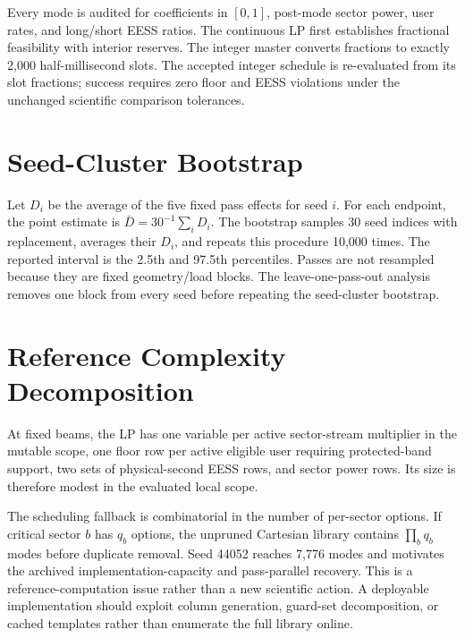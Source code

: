 \documentclass[journal]{IEEEtran}
\begin{document}
Every mode is audited for coefficients in $[0,1]$, post-mode sector power, user rates, and long/short EESS ratios. The continuous LP first establishes fractional feasibility with interior reserves. The integer master converts fractions to exactly 2,000 half-millisecond slots. The accepted integer schedule is re-evaluated from its slot fractions; success requires zero floor and EESS violations under the unchanged scientific comparison tolerances.

\section{Seed-Cluster Bootstrap}
Let $D_i$ be the average of the five fixed pass effects for seed $i$. For each endpoint, the point estimate is $\bar D=30^{-1}\sum_iD_i$. The bootstrap samples 30 seed indices with replacement, averages their $D_i$, and repeats this procedure 10,000 times. The reported interval is the 2.5th and 97.5th percentiles. Passes are not resampled because they are fixed geometry/load blocks. The leave-one-pass-out analysis removes one block from every seed before repeating the seed-cluster bootstrap.


\section{Reference Complexity Decomposition}
At fixed beams, the LP has one variable per active sector-stream multiplier in the mutable scope, one floor row per active eligible user requiring protected-band support, two sets of physical-second EESS rows, and sector power rows. Its size is therefore modest in the evaluated local scope.

The scheduling fallback is combinatorial in the number of per-sector options. If critical sector $b$ has $q_b$ options, the unpruned Cartesian library contains $\prod_b q_b$ modes before duplicate removal. Seed 44052 reaches 7,776 modes and motivates the archived implementation-capacity and pass-parallel recovery. This is a reference-computation issue rather than a new scientific action. A deployable implementation should exploit column generation, guard-set decomposition, or cached templates rather than enumerate the full library online.
\end{document}

